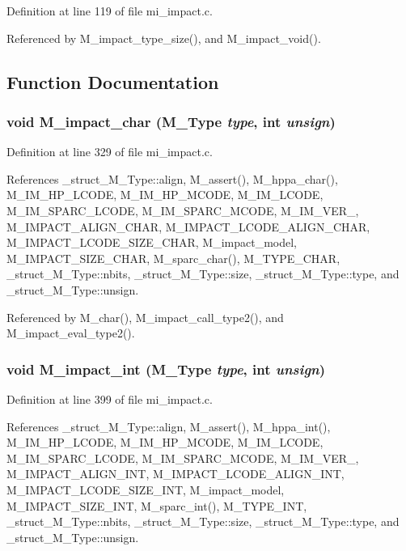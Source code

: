 Definition at line 119 of file mi\_\-impact.c.

Referenced by M\_\-impact\_\-type\_\-size(), and M\_\-impact\_\-void().

\subsection{Function Documentation}
\subsubsection{\setlength{\rightskip}{0pt plus 5cm}void M\_\-impact\_\-char (\bf{M\_\-Type} {\em type}, int {\em unsign})}\label{mi__impact_8c_df76a1d268f371b5071ca69f2015d8a1}




Definition at line 329 of file mi\_\-impact.c.

References \_\-struct\_\-M\_\-Type::align, M\_\-assert(), M\_\-hppa\_\-char(), M\_\-IM\_\-HP\_\-LCODE, M\_\-IM\_\-HP\_\-MCODE, M\_\-IM\_\-LCODE, M\_\-IM\_\-SPARC\_\-LCODE, M\_\-IM\_\-SPARC\_\-MCODE, M\_\-IM\_\-VER\_, M\_\-IMPACT\_\-ALIGN\_\-CHAR, M\_\-IMPACT\_\-LCODE\_\-ALIGN\_\-CHAR, M\_\-IMPACT\_\-LCODE\_\-SIZE\_\-CHAR, M\_\-impact\_\-model, M\_\-IMPACT\_\-SIZE\_\-CHAR, M\_\-sparc\_\-char(), M\_\-TYPE\_\-CHAR, \_\-struct\_\-M\_\-Type::nbits, \_\-struct\_\-M\_\-Type::size, \_\-struct\_\-M\_\-Type::type, and \_\-struct\_\-M\_\-Type::unsign.

Referenced by M\_\-char(), M\_\-impact\_\-call\_\-type2(), and M\_\-impact\_\-eval\_\-type2().
\subsubsection{\setlength{\rightskip}{0pt plus 5cm}void M\_\-impact\_\-int (\bf{M\_\-Type} {\em type}, int {\em unsign})}\label{mi__impact_8c_7c130c32d2c410901e9621468c7d7417}




Definition at line 399 of file mi\_\-impact.c.

References \_\-struct\_\-M\_\-Type::align, M\_\-assert(), M\_\-hppa\_\-int(), M\_\-IM\_\-HP\_\-LCODE, M\_\-IM\_\-HP\_\-MCODE, M\_\-IM\_\-LCODE, M\_\-IM\_\-SPARC\_\-LCODE, M\_\-IM\_\-SPARC\_\-MCODE, M\_\-IM\_\-VER\_, M\_\-IMPACT\_\-ALIGN\_\-INT, M\_\-IMPACT\_\-LCODE\_\-ALIGN\_\-INT, M\_\-IMPACT\_\-LCODE\_\-SIZE\_\-INT, M\_\-impact\_\-model, M\_\-IMPACT\_\-SIZE\_\-INT, M\_\-sparc\_\-int(), M\_\-TYPE\_\-INT, \_\-struct\_\-M\_\-Type::nbits, \_\-struct\_\-M\_\-Type::size, \_\-struct\_\-M\_\-Type::type, and \_\-struct\_\-M\_\-Type::unsign.

